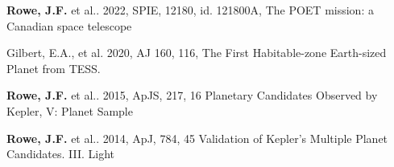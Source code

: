 \documentclass[margin,line]{res}
\begin{document}
\begin{resume}
\vspace*{-.15in}
{\bf Rowe, J.F.} et al.. 2022, SPIE, 12180, id. 121800A, The POET mission: a Canadian space telescope

\vspace*{-.15in}
Gilbert, E.A., et al. 2020, AJ 160, 116, The First Habitable-zone Earth-sized Planet from TESS.


\vspace*{-.15in}
{\bf Rowe, J.F.} et al.. 2015, ApJS, 217, 16 Planetary Candidates Observed by Kepler, V: Planet Sample%

\vspace*{-.15in}
{\bf Rowe, J.F.} et al.. 2014, ApJ, 784, 45 Validation of Kepler's Multiple Planet Candidates. III. Light %

\end{resume}
\end{document}
